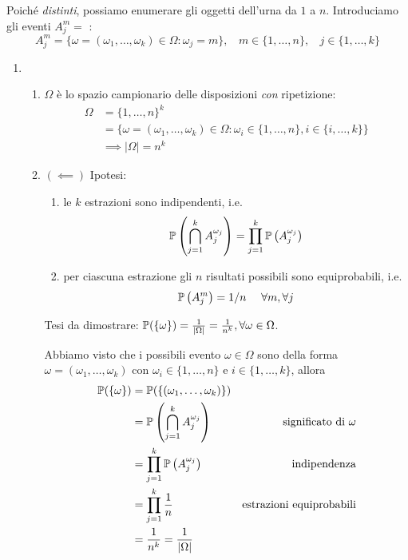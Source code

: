Poiché \textit{distinti}, possiamo enumerare gli oggetti dell'urna da $1$ a $n$. Introduciamo gli eventi $A_{j}^{m} =$ :
\begin{equation*}
	A_{j}^{m} =\{\omega =(\omega_{1} ,\dots ,\omega_{k}) \in \Omega :\omega_{j} =m\} ,\ \ \ \ m\in \{1,\dots,n\} ,\ \ \ \ j\in \{1,\dots,k\}
\end{equation*}
\begin{enumerate}
	\item 
	\begin{enumerate}
		\item $\Omega $ è lo spazio campionario delle disposizioni \textit{con} ripetizione:
		\begin{align*}
			\Omega  & =\{1,\dots,n\}^{k}\\
			 & =\{\omega =(\omega_{1} ,\dots ,\omega_{k}) \in \Omega :\omega_{i} \in \{1,\dots,n\} ,i\in \{i,\dots,k\}\}\\
			 & \implies | \Omega | =n^{k}
		\end{align*}
		\item $(\impliedby)$ Ipotesi:
		\begin{enumerate}
			\item le $k$ estrazioni sono indipendenti, i.e.
			\begin{equation*}
				\mathbb{P}\left(\bigcap_{j=1}^{k} A_{j}^{\omega_{j}}\right) =\prod_{j=1}^{k}\mathbb{P}\left(A_{j}^{\omega_{j}}\right)
			\end{equation*}
			\item per ciascuna estrazione gli $n$ risultati possibili sono equiprobabili, i.e.
			\begin{equation*}
				\mathbb{P}\left(A_{j}^{m}\right) =1/n\ \ \ \ \forall m,\forall j
			\end{equation*}
		\end{enumerate}
		Tesi da dimostrare: $\mathbb{P}(\{\omega \}) =\frac{1}{| \Omega | } =\frac{1}{n^{k}} ,\forall \omega \in \Omega $.

		Abbiamo visto che i possibili evento $\omega \in \Omega $ sono della forma $\omega =(\omega_{1} ,\dots ,\omega_{k})$ con $\omega_{i} \in \{1,\dots,n\}$ e $i\in \{1,\dots,k\}$, allora
		\begin{align*}
			\mathbb{P}(\{\omega \}) & =\mathbb{P}(\{(\omega_{1} ,\dots ,\omega_{k})\}) & \\
			 & =\mathbb{P}\left(\bigcap_{j=1}^{k} A_{j}^{\omega_{j}}\right) & \text{significato di} \ \omega \\
			 & =\prod_{j=1}^{k}\mathbb{P}\left(A_{j}^{\omega_{j}}\right) & \text{indipendenza}\\
			 & =\prod_{j=1}^{k}\frac{1}{n} & \text{estrazioni equiprobabili}\\
			 & =\frac{1}{n^{k}} =\frac{1}{| \Omega | } & 
		\end{align*}


\end{enumerate}
\end{enumerate}
